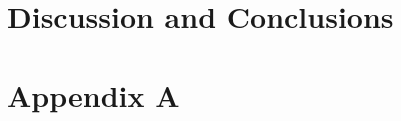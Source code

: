 \documentclass[12pt]{article}
\begin{document}
\section{Discussion and Conclusions}

% 
% 






\newpage
\section*{Appendix A}
\end{document}
